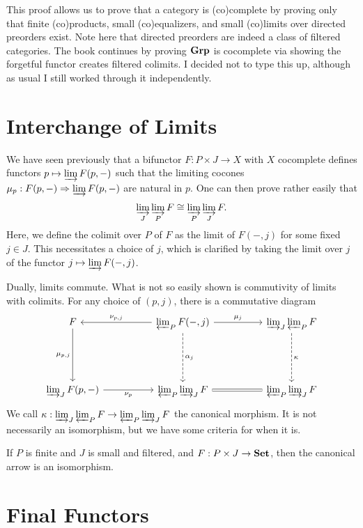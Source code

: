 This proof allows us to prove that a category is (co)complete by proving only that finite (co)products, small (co)equalizers, and small (co)limits over directed preorders exist. Note here that directed preorders are indeed a class of filtered categories. The book continues by proving $\mathbf{Grp} $ is cocomplete via showing the forgetful functor creates filtered colimits. I decided not to type this up, although as usual I still worked through it independently.

\section{Interchange of Limits}

We have seen previously that a bifunctor $F : P\times J \to X$ with $X$ cocomplete defines functors $p\mapsto \varinjlim F(p,-)$ such that the limiting cocones $\mu_p : F(p,-) \Rightarrow \varinjlim F(p,-)$ are natural in $p$. One can then prove rather easily that
\[
	\varinjlim_J \varinjlim_P F \cong \varinjlim _P \varinjlim _J F
.\]
Here, we define the colimit over $P$ of $F$ as the limit of $F(-,j)$ for some fixed $j\in J$. This necessitates a choice of $j$, which is clarified by taking the limit over $j$ of the functor $j\mapsto \varinjlim F(-,j)$.

Dually, limits commute. What is not so easily shown is commutivity of limits with colimits. For any choice of $(p,j)$, there is a commutative diagram
\[\begin{tikzcd}[row sep = 5em, column sep = 5em]
F \ar[" \mu_{p,j}  "', d]  & \varprojlim_P F(-,j)\ar[" \nu_{p,j}  "', l] \ar[" \mu_j ", r] \ar[" \alpha_j ", dashed, d]  & \varinjlim_J \varprojlim_P F \ar[" \kappa ", dashed, d]  \\
\varinjlim_J F(p,-)\ar[" \nu_p "', r]  & \varprojlim_P \varinjlim_J F \ar[equals, r]  & \varprojlim_P \varinjlim_J F
\end{tikzcd}\]
We call $\kappa : \varinjlim _J \varprojlim _P F \to \varprojlim _P \varinjlim _J F$ the canonical morphism. It is not necessarily an isomorphism, but we have some criteria for when it is.

\begin{theorem}\label{thm:9.2}
	If $P$ is finite and $J$ is small and filtered, and $F : P\times J \to \mathbf{Set} $, then the canonical arrow is an isomorphism.
\end{theorem}

\section{Final Functors}

